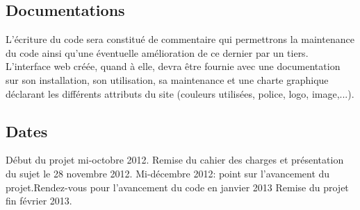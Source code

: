 \subsection{Documentations}
L'écriture du code sera constitué de commentaire qui permettrons la maintenance du code ainsi qu'une éventuelle amélioration de ce dernier par un tiers.
L'interface web créée, quand à elle, devra être fournie avec une documentation sur son installation, son utilisation, sa maintenance et une charte graphique déclarant les différents attributs du site (couleurs utilisées, police, logo, image,...).

\subsection{Dates}
Début du projet mi-octobre 2012. Remise du cahier des charges et présentation du sujet le 28 novembre 2012.  Mi-décembre 2012: point sur l'avancement du projet.Rendez-vous pour l'avancement du code en janvier 2013 Remise du projet fin février 2013.